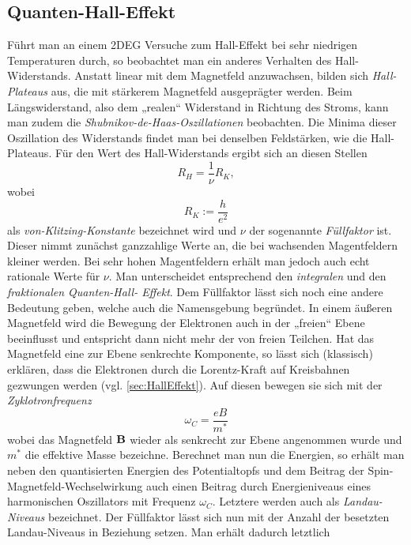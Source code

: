 \subsection{Quanten-Hall-Effekt}\label{sec:Quanten-Hall-Effekt}
Führt man an einem 2DEG Versuche zum Hall-Effekt bei sehr niedrigen Temperaturen durch, so beobachtet man ein anderes Verhalten des Hall-Widerstands. Anstatt linear mit dem Magnetfeld anzuwachsen, bilden sich \emph{Hall-Plateaus} aus, die mit stärkerem Magnetfeld ausgeprägter werden. Beim Längswiderstand, also dem „realen“ Widerstand in Richtung des Stroms, kann man zudem die \emph{Shubnikov-de-Haas-Oszillationen} beobachten. Die Minima dieser Oszillation des Widerstands findet man bei denselben Feldstärken, wie die Hall-Plateaus. Für den Wert des Hall-Widerstands ergibt sich an diesen Stellen
\begin{equation}\label{eq:HallvKl}
R_H = \frac{1}{\nu}R_K,
\end{equation}
wobei
\begin{equation}\label{eq:vKlitzing}
R_K := \frac{h}{e^2}
\end{equation}
als \emph{von-Klitzing-Konstante} bezeichnet wird und $\nu$ der sogenannte \emph{Füllfaktor} ist. Dieser nimmt zunächst ganzzahlige Werte an, die bei wachsenden Magentfeldern kleiner werden. Bei sehr hohen Magentfeldern erhält man jedoch auch echt rationale Werte für $\nu$. Man unterscheidet entsprechend den \emph{integralen} und den \emph{fraktionalen Quanten-Hall-
Effekt}.
Dem Füllfaktor lässt sich noch eine andere Bedeutung geben, welche auch die Namensgebung begründet.
In einem äußeren Magnetfeld wird die Bewegung der Elektronen auch in der „freien“ Ebene beeinflusst und entspricht dann nicht mehr der von freien Teilchen. Hat das Magnetfeld eine zur Ebene senkrechte Komponente, so lässt sich (klassisch) erklären, dass die Elektronen durch die Lorentz-Kraft auf Kreisbahnen gezwungen werden (vgl. \autoref{sec:HallEffekt}). Auf diesen bewegen sie sich mit der \emph{Zyklotronfrequenz}
$$\omega_C = \frac{eB}{m^*}$$
wobei das Magnetfeld $\textbf{B}$ wieder als senkrecht zur Ebene angenommen wurde und $m^*$ die effektive Masse bezeichne. Berechnet man nun die Energien, so erhält man neben den quantisierten Energien des Potentialtopfs und dem Beitrag der Spin-Magnetfeld-Wechselwirkung auch einen Beitrag durch Energieniveaus eines harmonischen Oszillators mit Frequenz $\omega_C$. Letztere werden auch als \emph{Landau-Niveaus} bezeichnet. Der Füllfaktor
lässt sich nun mit der Anzahl der besetzten Landau-Niveaus in Beziehung setzen. Man erhält dadurch letztlich
